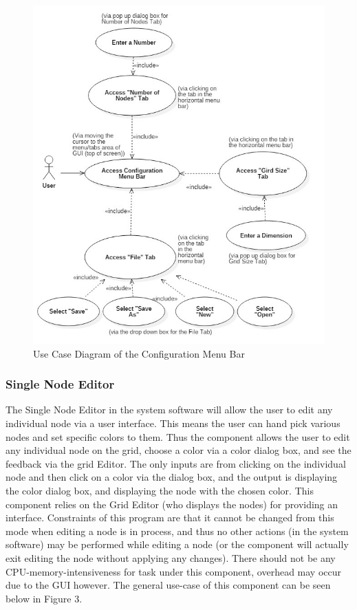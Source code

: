 \documentclass[12pt]{article}
\begin{document}
			\begin{figure}[ht!]
				\centering
				\includegraphics[width=170mm]{Configuration_Editor.JPG}
				\caption{Use Case Diagram of the Configuration Menu Bar \label{overflow}}
			\end{figure}
			
			\subsubsection {Single Node Editor}
			\forceindent The Single Node Editor in the system software will allow the user to edit any individual node via a user interface. This means the user can hand pick various nodes and set specific colors to them. Thus the component allows the user to edit any individual node on the grid, choose a color via a color dialog box, and see the feedback via the grid Editor. The only inputs are from clicking on the individual node and then click on a color via the dialog box, and the output is displaying the color dialog box, and displaying the node with the chosen color. This component relies on the Grid Editor (who displays the nodes) for providing an interface. Constraints of this program are that it cannot be changed from this mode when editing a node is in process, and thus no other actions (in the system software) may be performed while editing a node (or the component will actually exit editing the node without applying any changes). There should not be any CPU-memory-intensiveness for task under this component, overhead may occur due to the GUI however. The general use-case of this component can be seen below in Figure 3.
			
\end{document}
